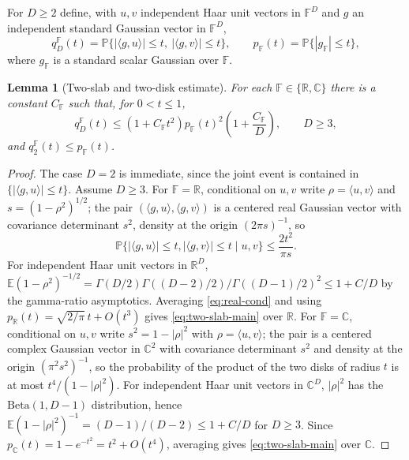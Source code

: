 \documentclass[10pt,a4paper]{amsart}
\newtheorem{lemma}[theorem]{Lemma}
\newcommand{\R}{\mathbb{R}}
\newcommand{\C}{\mathbb{C}}
\newcommand{\F}{\mathbb{F}}
\newcommand{\PP}{\mathbb{P}}
\newcommand{\EE}{\mathbb{E}}
\begin{document}
For $D\ge2$ define, with $u,v$ independent Haar unit vectors in $\F^D$ and $g$ an independent standard
Gaussian vector in $\F^D$,
\begin{equation}\label{eq:qD}
  q_D^\F(t)=\PP\{|\langle g,u\rangle|\le t,\ |\langle g,v\rangle|\le t\},
  \qquad
  p_\F(t)=\PP\{|g_\F|\le t\},
\end{equation}
where $g_\F$ is a standard scalar Gaussian over $\F$.

\begin{lemma}[Two-slab and two-disk estimate]\label{lem:two-slab}
For each $\F\in\{\R,\C\}$ there is a constant $C_\F$ such that, for $0<t\le1$,
\begin{equation}\label{eq:two-slab-main}
  q_D^\F(t)\le (1+C_\F t^2)p_\F(t)^2\left(1+\frac{C_\F}{D}\right),\qquad D\ge3,
\end{equation}
and $q_2^\F(t)\le p_\F(t)$.
\end{lemma}

\begin{proof}
The case $D=2$ is immediate, since the joint event is contained in $\{|\langle g,u\rangle|\le t\}$.
Assume $D\ge3$. For $\F=\R$, conditional on $u,v$ write $\rho=\langle u,v\rangle$ and
$s=(1-\rho^2)^{1/2}$; the pair $(\langle g,u\rangle,\langle g,v\rangle)$ is a centered real Gaussian
vector with covariance determinant $s^2$, density at the origin $(2\pi s)^{-1}$, so
\begin{equation}\label{eq:real-cond}
  \PP\{|\langle g,u\rangle|\le t, |\langle g,v\rangle|\le t\mid u,v\}\le \frac{2t^2}{\pi s}.
\end{equation}
For independent Haar unit vectors in $\R^D$,
$\EE(1-\rho^2)^{-1/2}=\Gamma(D/2)\Gamma((D-2)/2)/\Gamma((D-1)/2)^2\le1+C/D$ by the gamma-ratio
asymptotics. Averaging \eqref{eq:real-cond} and using $p_\R(t)=\sqrt{2/\pi}\,t+O(t^3)$ gives
\eqref{eq:two-slab-main} over $\R$. For $\F=\C$, conditional on $u,v$ write $s^2=1-|\rho|^2$ with
$\rho=\langle u,v\rangle$; the pair is a centered complex Gaussian vector in $\C^2$ with covariance
determinant $s^2$ and density at the origin $(\pi^2 s^2)^{-1}$, so the probability of the product of
the two disks of radius $t$ is at most $t^4/(1-|\rho|^2)$. For independent Haar unit vectors in $\C^D$,
$|\rho|^2$ has the $\mathrm{Beta}(1,D-1)$ distribution, hence
$\EE(1-|\rho|^2)^{-1}=(D-1)/(D-2)\le1+C/D$ for $D\ge3$. Since $p_\C(t)=1-e^{-t^2}=t^2+O(t^4)$, averaging
gives \eqref{eq:two-slab-main} over $\C$.
\end{proof}
\end{document}
